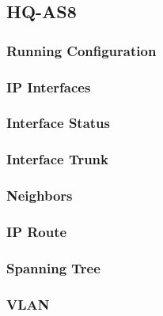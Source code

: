 \subsection{HQ-AS8}
\subsubsection{Running Configuration}


\subsubsection{IP Interfaces}


\subsubsection{Interface Status}


\subsubsection{Interface Trunk}


\subsubsection{Neighbors}


\subsubsection{IP Route}


\subsubsection{Spanning Tree}


\subsubsection{VLAN}




